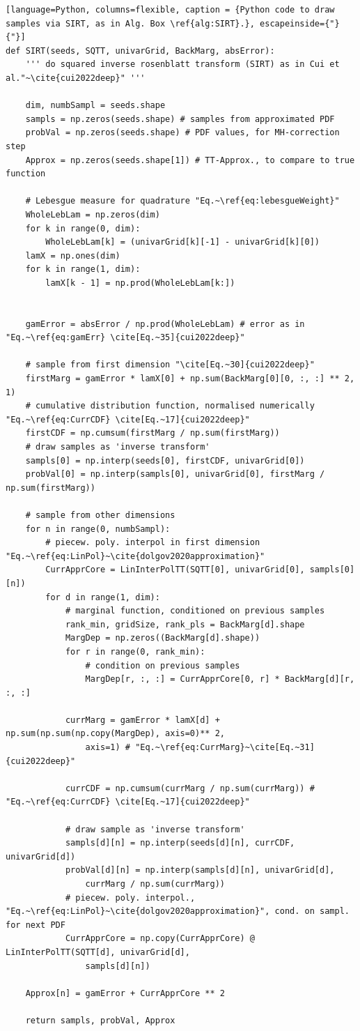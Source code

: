 \clearpage
\begin{lstlisting}[language=Python,	columns=flexible, caption = {Python code to draw samples via SIRT, as in Alg. Box \ref{alg:SIRT}.}, escapeinside={"}{"}]
def SIRT(seeds, SQTT, univarGrid, BackMarg, absError):
	''' do squared inverse rosenblatt transform (SIRT) as in Cui et al."~\cite{cui2022deep}" '''
	
	dim, numbSampl = seeds.shape
	sampls = np.zeros(seeds.shape) # samples from approximated PDF
	probVal = np.zeros(seeds.shape) # PDF values, for MH-correction step
	Approx = np.zeros(seeds.shape[1]) # TT-Approx., to compare to true function
	
	# Lebesgue measure for quadrature "Eq.~\ref{eq:lebesgueWeight}"
	WholeLebLam = np.zeros(dim)
	for k in range(0, dim):
		WholeLebLam[k] = (univarGrid[k][-1] - univarGrid[k][0])
	lamX = np.ones(dim)
	for k in range(1, dim):
		lamX[k - 1] = np.prod(WholeLebLam[k:])
	
	
	gamError = absError / np.prod(WholeLebLam) # error as in "Eq.~\ref{eq:gamErr} \cite[Eq.~35]{cui2022deep}"
	
	# sample from first dimension "\cite[Eq.~30]{cui2022deep}"
	firstMarg = gamError * lamX[0] + np.sum(BackMarg[0][0, :, :] ** 2, 1)
	# cumulative distribution function, normalised numerically "Eq.~\ref{eq:CurrCDF} \cite[Eq.~17]{cui2022deep}"
	firstCDF = np.cumsum(firstMarg / np.sum(firstMarg))
	# draw samples as 'inverse transform'
	sampls[0] = np.interp(seeds[0], firstCDF, univarGrid[0])
	probVal[0] = np.interp(sampls[0], univarGrid[0], firstMarg / np.sum(firstMarg))
	
	# sample from other dimensions
	for n in range(0, numbSampl):
		# piecew. poly. interpol in first dimension "Eq.~\ref{eq:LinPol}~\cite{dolgov2020approximation}"
		CurrApprCore = LinInterPolTT(SQTT[0], univarGrid[0], sampls[0][n])
		for d in range(1, dim):
			# marginal function, conditioned on previous samples
			rank_min, gridSize, rank_pls = BackMarg[d].shape
			MargDep = np.zeros((BackMarg[d].shape))
			for r in range(0, rank_min):
				# condition on previous samples
				MargDep[r, :, :] = CurrApprCore[0, r] * BackMarg[d][r, :, :]
			
			currMarg = gamError * lamX[d] + np.sum(np.sum(np.copy(MargDep), axis=0)** 2,
				axis=1) # "Eq.~\ref{eq:CurrMarg}~\cite[Eq.~31]{cui2022deep}"
			
			currCDF = np.cumsum(currMarg / np.sum(currMarg)) # "Eq.~\ref{eq:CurrCDF} \cite[Eq.~17]{cui2022deep}"
			
			# draw sample as 'inverse transform'
			sampls[d][n] = np.interp(seeds[d][n], currCDF, univarGrid[d])
			probVal[d][n] = np.interp(sampls[d][n], univarGrid[d],  
				currMarg / np.sum(currMarg))
			# piecew. poly. interpol., "Eq.~\ref{eq:LinPol}~\cite{dolgov2020approximation}", cond. on sampl. for next PDF
			CurrApprCore = np.copy(CurrApprCore) @ LinInterPolTT(SQTT[d], univarGrid[d], 
				sampls[d][n]) 
	
	Approx[n] = gamError + CurrApprCore ** 2
	
	return sampls, probVal, Approx
\end{lstlisting}
\clearpage



